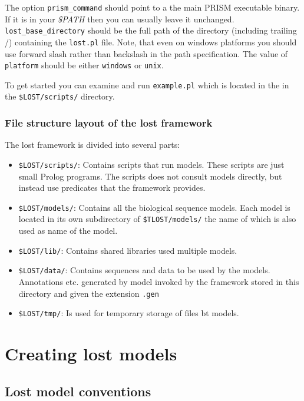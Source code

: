 \documentclass{book}
\begin{document}
The option \texttt{prism\_command} should point to a the main PRISM executable
binary. If it is in your  \emph{\$PATH} then you can usually leave it unchanged.\\
\texttt{lost\_base\_directory} should be the full path of the
directory (including trailing /) containing the \texttt{lost.pl}
file.  Note, that even on windows platforms you should use forward
slash rather than backslash in the path specification. The value of
\texttt{platform} should be either \texttt{windows} or \texttt{unix}. 

To get started you can examine and run \texttt{example.pl} which 
is located in the in the \texttt{\$LOST/scripts/} directory.

\subsection{File structure layout of the lost framework}

The lost framework is divided into several parts:
\begin{itemize}
\item \texttt{\$LOST/scripts/}: Contains scripts that run
  models. These scripts are just small Prolog programs. The scripts
  does not consult models directly, but instead use predicates that
  the framework provides.
\item \texttt{\$LOST/models/}: Contains all the biological sequence
  models. Each model is located in its own subdirectory of
  \texttt{\$TLOST/models/} the name of which is also used as name of
  the model.
\item \texttt{\$LOST/lib/}: Contains shared libraries used multiple
  models.
\item \texttt{\$LOST/data/}: Contains sequences and data to be used by
  the models. Annotations etc. generated by model invoked by the
  framework stored in this directory and given the extension
  \texttt{.gen} 
\item \texttt{\$LOST/tmp/}: Is used for temporary storage of files bt models.
\end{itemize}


\chapter{Creating lost models}

\section{Lost model conventions}\label{sec:lost_model_conventions}
\end{document}
